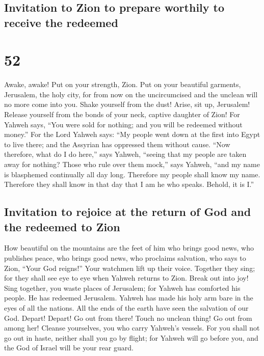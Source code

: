 \hypertarget{invitation-to-zion-to-prepare-worthily-to-receive-the-redeemed}{%
\subsection{Invitation to Zion to prepare worthily to receive the
redeemed}\label{invitation-to-zion-to-prepare-worthily-to-receive-the-redeemed}}

\hypertarget{section-51}{%
\section{52}\label{section-51}}

 Awake, awake! Put on your strength, Zion. Put on your
beautiful garments, Jerusalem, the holy city, for from now on the
uncircumcised and the unclean will no more come into you. 
Shake yourself from the dust! Arise, sit up, Jerusalem! Release yourself
from the bonds of your neck, captive daughter of Zion! 
For Yahweh says, ``You were sold for nothing; and you will be redeemed
without money.''  For the Lord Yahweh says: ``My people
went down at the first into Egypt to live there; and the Assyrian has
oppressed them without cause.  ``Now therefore, what do I
do here,'' says Yahweh, ``seeing that my people are taken away for
nothing? Those who rule over them mock,'' says Yahweh, ``and my name is
blasphemed continually all day long.  Therefore my people
shall know my name. Therefore they shall know in that day that I am he
who speaks. Behold, it is I.''

\hypertarget{invitation-to-rejoice-at-the-return-of-god-and-the-redeemed-to-zion}{%
\subsection{Invitation to rejoice at the return of God and the redeemed
to
Zion}\label{invitation-to-rejoice-at-the-return-of-god-and-the-redeemed-to-zion}}

 How beautiful on the mountains are the feet of him who
brings good news, who publishes peace, who brings good news, who
proclaims salvation, who says to Zion, ``Your God reigns!''
 Your watchmen lift up their voice. Together they sing;
for they shall see eye to eye when Yahweh returns to Zion.
 Break out into joy! Sing together, you waste places of
Jerusalem; for Yahweh has comforted his people. He has redeemed
Jerusalem.  Yahweh has made his holy arm bare in the eyes
of all the nations. All the ends of the earth have seen the salvation of
our God.  Depart! Depart! Go out from there! Touch no
unclean thing! Go out from among her! Cleanse yourselves, you who carry
Yahweh's vessels.  For you shall not go out in haste,
neither shall you go by flight; for Yahweh will go before you, and the
God of Israel will be your rear guard.


